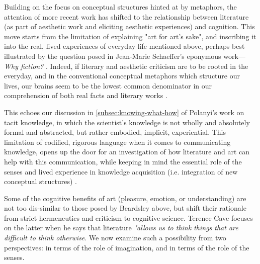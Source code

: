 Building on the focus on conceptual structures hinted at by metaphors, the attention of more recent work has shifted to the relationship between literature (as part of aesthetic work and eliciting aesthetic experiences) and cognition. This move starts from the limitation of explaining "art for art's sake", and inscribing it into the real, lived experiences of everyday life mentioned above, perhaps best illustrated by the question posed in Jean-Marie Schaeffer's eponymous work—\emph{Why fiction?} \citep{schaeffer_pourquoi_1999}. Indeed, if literary and aesthetic criticism are to be rooted in the everyday, and in the conventional conceptual metaphors which structure our lives, our brains seem to be the lowest common denominator in our comprehension of both real facts and literary works \citep{lavocat_interpretation_2015}.

This echoes our discussion in \autoref{subsec:knowing-what-how} of Polanyi's work on tacit knowledge, in which the scientist's knowledge is not wholly and absolutely formal and abstracted, but rather embodied, implicit, experiential. This limitation of codified, rigorous language when it comes to communicating knowledge, opens up the door for an investigation of how literature and art can help with this communication, while keeping in mind the essential role of the senses and lived experience in knowledge acquisition (i.e. integration of new conceptual structures) \citep{polanyi_tacit_2009}.

Some of the cognitive benefits of art (pleasure, emotion, or understanding) are not too dis-similar to those posed by Beardsley above, but shift their rationale from strict hermeneutics and criticism to cognitive science. Terence Cave focuses on the latter when he says that literature \emph{"allows us to think things that are difficult to think otherwise}. We now examine such a possibility from two perspectives: in terms of the role of imagination, and in terms of the role of the senses.

